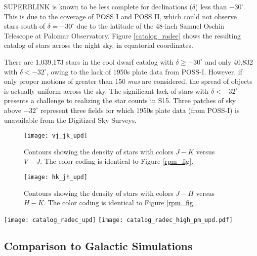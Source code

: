 \documentclass[twocolumn]{aastex62}
\begin{document}
SUPERBLINK is known to be less complete for declinations ($\delta$) less than $-30^\circ$.  This is due to the coverage of POSS I and POSS II, which could not observe stars south of $\delta=-30^\circ$ due to the latitude of the 48-inch Samuel Oschin Telescope at Palomar Observatory.   Figure \ref{catalog_radec} shows the resulting catalog of stars across the night sky, in equatorial coordinates.  

There are 1,039,173 stars in the cool dwarf catalog with $\delta \ge -30^\circ$ and only 40,832 with $\delta < -32^\circ$,  owing to the lack of 1950s plate data from POSS-I.  However, if only proper motions of greater than 150 {\it mas} are considered, the spread of objects is actually uniform across the sky.  The significant lack of stars with $\delta<-32^\circ$ presents a challenge to realizing the star counts in S15.   Three patches of sky above $-32^\circ$ represent three fields for which 1950s plate data (from POSS-I) is unavailable from the Digitized Sky Surveys.


\begin{figure}
    \centering
 \texttt{[image: vj\_jk\_upd]}
 \caption{Contours showing the density of stars with colors $J-K$ versus $V-J$.  The color coding is identical to Figure \ref{rpm_fig}.}
 \label{vj_jk_fig}
\end{figure}

\begin{figure}
    \centering
 \texttt{[image: hk\_jh\_upd]}
 \caption{Contours showing the density of stars with colors $J-H$ versus $H-K$.  The color coding is identical to Figure \ref{rpm_fig}.}
 \label{hk_jh_fig}
\end{figure}


\begin{figure*}
    \centering
    \texttt{[image: catalog\_radec\_upd]}
    \texttt{[image: catalog\_radec\_high\_pm\_upd.pdf]}
    \caption{{\it Top:} Projected sky image of the locations of stars in the cool dwarf catalog in equatorial coordinates.  The lack of cool dwarfs with $\delta < -32^\circ$ is a consequence of a lack of long-time-baseline proper motion data incorporated into SUPERBLINK. {\it Bottom}: Same as the top image, but only including stars with proper motions greater than 150 {\it mas}, where the catalog is more complete in the south.}
    \label{catalog_radec}
\end{figure*}


\subsection{Comparison to Galactic Simulations}
\end{document}
